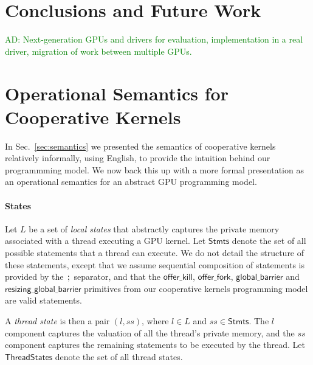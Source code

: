\documentclass[numbers,nocopyrightspace,10pt]{sigplanconf}
\newcommand{\ADComment}[1]{\textcolor{green}{AD: #1}}
\newcommand{\mysec}{Sec.~}
\newcommand{\code}[1]{\lstset{basicstyle=\tt}\lstinline!#1!\lstset{basicstyle=\scriptsize\tt}}
\newcommand{\offerfork}{\mathsf{offer\_fork}}
\newcommand{\offerkill}{\mathsf{offer\_kill}}
\newcommand{\globalbarrier}{\mathsf{global\_barrier}}
\newcommand{\resizingglobalbarrier}{\mathsf{resizing\_global\_barrier}}
\begin{document}



\section{Conclusions and Future Work}\label{sec:conclusion}

\ADComment{Next-generation GPUs and drivers for evaluation,
  implementation in a real driver, migration of work between multiple
  GPUs.}

\clearpage




\clearpage

\appendix

\section{Operational Semantics for Cooperative Kernels}\label{appendix:semantics}

\newcommand{\myss}{\mathit{ss}}
\newcommand{\Stmts}{\mathsf{Stmts}}
\newcommand{\threadstates}{\mathsf{ThreadStates}}
\newcommand{\sharedstates}{\mathsf{SharedStates}}
\newcommand{\sync}{\mathsf{sync}}

In \mysec\ref{sec:semantics} we presented the semantics of cooperative
kernels relatively informally, using English, to provide the intuition
behind our programmming model.  We now back this up with a more formal
presentation as an operational semantics for an abstract GPU
programming model.

\paragraph{States}

Let $L$ be a set of \emph{local states} that abstractly captures the
private memory associated with a thread executing a GPU kernel.  Let
$\Stmts$ denote the set of all possible statements that a
thread can execute.  We do not detail the structure of these
statements, except that we assume sequential composition of statements
is provided by the $\code{;}$ separator, and that the $\offerkill$,
$\offerfork$, $\globalbarrier$ and $\resizingglobalbarrier$ primitives
from our cooperative kernels programming model are valid statements.

A \emph{thread state} is then a pair $(l, \myss)$, where $l \in L$ and
$\myss \in \Stmts$.  The $l$ component captures the valuation of all the
thread's private memory, and the $\myss$ component captures the
remaining statements to be executed by the thread.  Let $\threadstates$ denote the set of all thread states.
\end{document}

